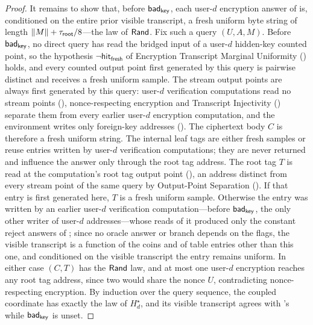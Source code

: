 \begin{proof}
It remains to show that, before $\mathsf{bad}_{\mathsf{key}}$, each user-$d$ encryption
answer of \Grej{} is, conditioned on the entire prior visible
transcript, a fresh uniform byte string of length $\|M\| +
\tau_{\mathsf{root}}/8$---the law of $\mathsf{Rand}$. Fix such a query $(U, A, M)$. Before
$\mathsf{bad}_{\mathsf{key}}$, no direct query has read the bridged input of a user-$d$
hidden-key counted point, so the hypothesis
$\neg\mathsf{hit}_{\mathsf{fresh}}$ of Encryption Transcript Marginal
Uniformity () holds, and
every counted output point first generated by this query is pairwise
distinct and receives a fresh uniform sample. The stream output points
are always first generated by this query: user-$d$ verification
computations read no stream points (),
nonce-respecting encryption and Transcript Injectivity
() separate them from every earlier user-$d$
encryption computation, and the environment writes only foreign-key
addresses (). The ciphertext body $C$ is
therefore a fresh uniform string. The internal leaf tags are either
fresh samples or reuse entries written by user-$d$ verification
computations; they are never returned and influence the answer only
through the root tag address. The root tag $T$ is read at the
computation's root tag output point (),
an address distinct from every stream point of the same query by
Output-Point Separation (). If that entry is first
generated here, $T$ is a fresh uniform sample. Otherwise the entry was
written by an earlier user-$d$ verification computation---before
$\mathsf{bad}_{\mathsf{key}}$, the only other writer of user-$d$ addresses---whose reads of
it produced only the constant reject answers of \Grej{}; since no
oracle answer or branch depends on the flags, the visible transcript is
a function of the coins and of table entries other than this one, and
conditioned on the visible transcript the entry remains uniform. In
either case $(C, T)$ has the $\mathsf{Rand}$ law, and at most one user-$d$
encryption reaches any root tag address, since two would share the
nonce $U$, contradicting nonce-respecting encryption. By induction over
the query sequence, the coupled \Gideal{} coordinate has exactly the
law of $H_d^\star$, and its visible transcript agrees with \Grej{}'s
while $\mathsf{bad}_{\mathsf{key}}$ is unset.


\end{proof}
